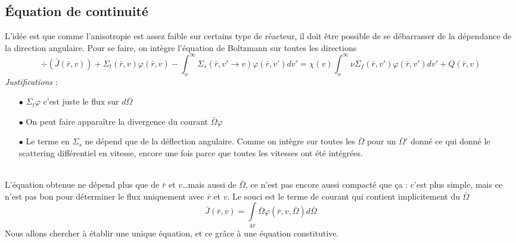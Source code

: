 \subsection{Équation de continuité}
L'idée est que comme l'anisotropie est assez faible sur certains type de réacteur, il doit être 
possible de se débarrasser de la dépendance de la direction angulaire. Pour se faire, on 
intègre l'équation de Boltzmann sur toutes les directions
\begin{equation}
\div(\bar J(\bar r,v)) + {\Sigma _t}(\bar r,v)\varphi (\bar r,v) - \int_o^\infty     {\Sigma _s}(\bar r,v' \to v)\varphi (\bar r,v')dv'  = \chi (v)\int_o^\infty     \nu {\Sigma _f}(\bar r,v')\varphi (\bar r,v')dv' + Q(\bar r,v)
\end{equation}
\textit{Justifications} :
\begin{itemize}
\item[$\bullet$] $\Sigma_t\varphi$ c'est juste le flux sur $d\bar\Omega$
\item[$\bullet$] On peut faire apparaître la divergence du courant $\bar{\Omega}\varphi$
\item[$\bullet$] Le terme en $\Sigma_s$ ne dépend que de la déflection angulaire. Comme on intègre 
sur toutes les $\bar\Omega$ pour un $\bar{\Omega}'$ donné ce qui donné le scattering différentiel 
en vitesse, encore une fois parce que toutes les vitesses ont été intégrées.
\end{itemize}\ \\

L'équation obtenue ne dépend plus que de $\bar r$ et $v$\dots mais aussi de $\bar\Omega$, ce n'est 
pas encore aussi compacté que ça : c'est plus simple, mais ce n'est pas bon pour déterminer le 
flux uniquement avec $\bar r$ et $v$. Le souci est le terme de courant qui contient implicitement 
du $\bar\Omega$
\begin{equation}
\bar J(\bar r,v) = \int\limits_{4\pi }   \bar \Omega \varphi (\bar r,v,\bar \Omega )d\bar \Omega 
\end{equation}
Nous allons chercher à établir une unique équation, et ce grâce à une équation constitutive.

